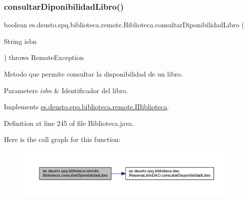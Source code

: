 \subsubsection{\texorpdfstring{consultar\+Diponibilidad\+Libro()}{consultarDiponibilidadLibro()}}
{\footnotesize\ttfamily boolean es.\+deusto.\+spq.\+biblioteca.\+remote.\+Biblioteca.\+consultar\+Diponibilidad\+Libro (\begin{DoxyParamCaption}\item[{String}]{isbn }\end{DoxyParamCaption}) throws Remote\+Exception}

Metodo que permite consultar la disponibilidad de un libro. 
\begin{DoxyParams}{Parameters}
{\em isbn} & Identificador del libro. \\
\hline
\end{DoxyParams}


Implements \mbox{\hyperlink{interfacees_1_1deusto_1_1spq_1_1biblioteca_1_1remote_1_1_i_biblioteca_ae8795f9243cf23bff712d636c182193d}{es.\+deusto.\+spq.\+biblioteca.\+remote.\+I\+Biblioteca}}.



Definition at line 245 of file Biblioteca.\+java.

Here is the call graph for this function\+:
\nopagebreak
\begin{figure}[H]
\begin{center}
\leavevmode
\includegraphics[width=350pt]{classes_1_1deusto_1_1spq_1_1biblioteca_1_1remote_1_1_biblioteca_a43429c3eea8c1a6a49b6994439606ee3_cgraph}
\end{center}
\end{figure}
\mbox{\label{classes_1_1deusto_1_1spq_1_1biblioteca_1_1remote_1_1_biblioteca_a447029538e7996f0ea4faafff1c4351e}} 

